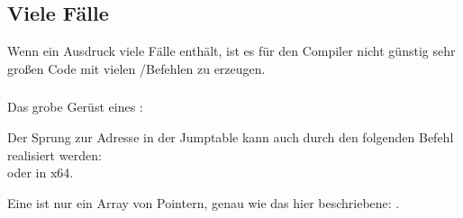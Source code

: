 \subsection{Viele Fälle}
Wenn ein  Ausdruck viele Fälle enthält, ist es für den Compiler nicht günstig sehr großen Code mit vielen
\JE/\JNE Befehlen zu erzeugen.







\subsubsection{\Conclusion{}}

Das grobe Gerüst eines :


Der Sprung zur Adresse in der Jumptable kann auch durch den folgenden Befehl realisiert werden:\\
oder  in x64.

Eine  ist nur ein Array von Pointern, genau wie das hier beschriebene:
.
